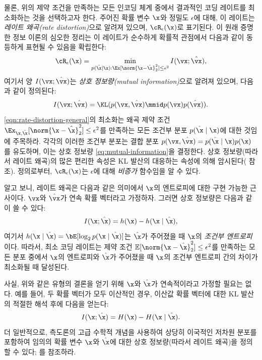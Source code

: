 \documentclass[../../book-main_ko.tex]{subfiles}
\begin{document}
물론, 위의 제약 조건을 만족하는 모든 인코딩 체계 중에서 결과적인 코딩 레이트를 최소화하는 것을 선택하고자 한다. 주어진 확률 변수 $\x$와 정밀도 $\epsilon$에 대해, 이 레이트는 {\em 레이트 왜곡(rate distortion)}으로 알려져 있으며, $\cR_{\epsilon}(\x)$로 표기된다.
\textcite{shannon1959coding}이 원래 증명한 정보 이론의 심오한 정리는 이 레이트가 순수하게 확률적 관점에서 다음과 같이 동등하게 표현될 수 있음을 확립한다:
\begin{equation}
	\cR_{\epsilon}(\x)
	= \min_{p(\hat \x \mid \x): \Ex[\norm{\x -\hat \x}_2^{2}] \le \epsilon^{2}}
	I(\vx; \hat{\vx}),
    \label{eqn:rate-distortion-general}
\end{equation}
여기서 양 $I(\vx; \hat{\vx})$는 \textit{상호 정보량(mutual information)}으로 알려져 있으며, 다음과 같이 정의된다:
\begin{equation}\label{eq:mutual-information}
	I(\vx; \hat{\vx})
	= \KL(p(\vx, \hat{\vx}) \mmid p(\vx) p(\hat{\vx})).
\end{equation}
\eqref{eqn:rate-distortion-general}의 최소화는 왜곡 제약 조건 $\Ex_{\x, \hat \x}[\norm{\x- \hat \x}_2^{2}] \le \epsilon^{2}$를 만족하는 모든 조건부 분포 $p(\hat \x \mid \x)$에 대한 것임에 주목하라.
각각의 이러한 조건부 분포는 결합 분포 $p(\vx, \hat{\vx}) = p(\hat\x \mid \x) p(\x)$를 유도하며, 이는 상호 정보량 \eqref{eq:mutual-information}을 결정한다.
상호 정보량(따라서 레이트 왜곡)의 많은 편리한 속성은 KL 발산의 대응하는 속성에 의해 암시된다( 참조).
정의로부터, $\cR_{\epsilon}(\x)$는 $\epsilon$에 대해 {\em 비증가} 함수임을 알 수 있다.

\begin{remark}
	알고 보니, 레이트 왜곡은 다음과 같은 의미에서 $\x$의 엔트로피에 대한 구현 가능한 근사이다.
	$\vx$와 $\hat{\vx}$가 연속 확률 벡터라고 가정하자.
	그러면 상호 정보량은 다음과 같이 쓸 수 있다:
	\begin{equation}\label{eq:information-entropy}
		I(\x; \hat\x) = h(\x) - h(\x \mid \hat \x),
	\end{equation}
	여기서 $h(\x \mid \hat \x) = \bE[\log_2 p(\x \mid \hat\x)]$는 $\hat \x$가 주어졌을 때 $\x$의 \textit{조건부 엔트로피}이다.
	따라서, 최소 코딩 레이트는 제약 조건 $\mathbb{E} [\norm{\x- \hat \x}_2^2] \le \epsilon^2$를 만족하는 모든 분포 중에서 $\x$의 엔트로피와 $\hat \x$가 주어졌을 때 $\x$의 조건부 엔트로피 간의 차이가 최소화될 때 달성된다.

	사실, 위와 같은 유형의 결론을 얻기 위해 $\x$와 $\hat \x$가 연속적이라고 가정할 필요는 없다. 예를 들어, 두 확률 벡터가 모두 이산적인 경우, 이산값 확률 벡터에 대한 KL 발산의 적절한 해석 후에 다음을 얻는다:
	\begin{equation}
		I(\x; \hat\x) = H(\x) - H(\x \mid \hat \x).
	\end{equation}
	더 일반적으로, 측도론의 고급 수학적 개념을 사용하여 상당히 이국적인 저차원 분포를 포함하여 임의의 확률 변수 $\x$와 $\hat \x$에 대한 상호 정보량(따라서 레이트 왜곡)을 정의할 수 있다; \textcite[\S 8.5]{Cover-Thomas}를 참조하라.
\end{remark}
\end{document}
